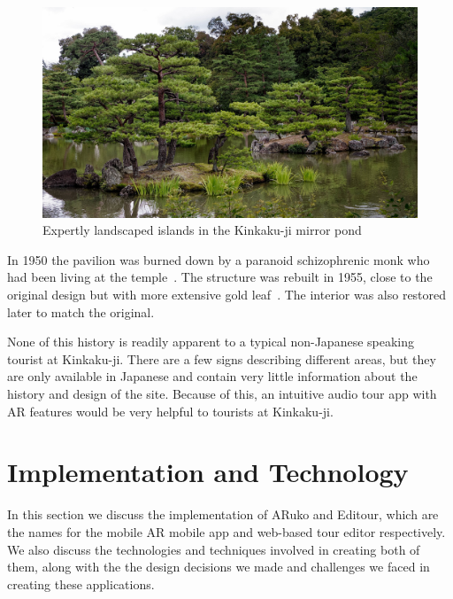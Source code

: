 \documentclass[a4paper, 10pt, american, titlepage]{article}
\begin{document}
\begin{figure}[h]
	\centering
	\includegraphics[width=\textwidth]{kinkakuji-grounds.jpg}
    \caption[Expertly landscaped islands in the Kinkaku-ji mirror pond]{Expertly
		landscaped islands in the Kinkaku-ji mirror pond~\autocite{desousa2014}}
	\label{fig:kinkakujiGrounds}
\end{figure}

In 1950 the pavilion was burned down by a paranoid schizophrenic monk who had
been living at the temple~\autocite{borowitz2005}. The structure was rebuilt in
1955, close to the original design but with more extensive gold
leaf~\autocite{bornoff2000}. The interior was also restored later to match the
original.

None of this history is readily apparent to a typical non-Japanese speaking
tourist at Kinkaku-ji. There are a few signs describing different areas, but
they are only available in Japanese and contain very little information about
the history and design of the site. Because of this, an intuitive audio tour app
with AR features would be very helpful to tourists at Kinkaku-ji.

\clearpage

\section{Implementation and Technology}
\label{sec:implementationAndTechnology}

In this section we discuss the implementation of ARuko and Editour, which are
the names for the mobile AR mobile app and web-based tour editor respectively.
We also discuss the technologies and techniques involved in creating both of
them, along with the the design decisions we made and challenges we faced in
creating these applications.
\end{document}
